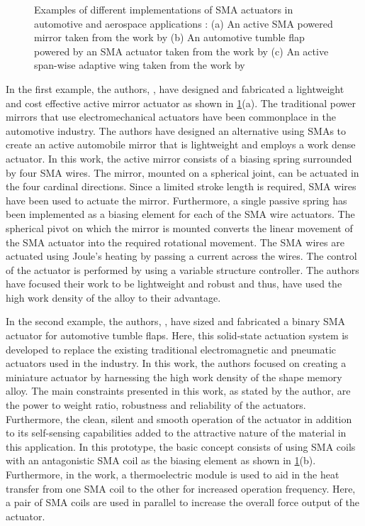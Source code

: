 \begin{figure}[hbt!]
    \centering
    
    \caption[Examples of different implementations of SMA actuators in automotive and aerospace applications]{Examples of different implementations of SMA actuators in automotive and aerospace applications : (a) An active SMA powered mirror taken from the work by \cite{williamsControlAutomotiveShape2010a} (b) An automotive tumble flap powered by an SMA actuator taken from the work by \cite{belliniMechatronicDesignShape2009} (c) An active span-wise adaptive wing taken from the work by \cite{belliniMechatronicDesignShape2009}}
    \label{fig:auto-examples}
\end{figure}

In the first example, the authors, \cite{williamsControlAutomotiveShape2010a}, have designed and fabricated a lightweight and cost effective active mirror actuator as shown in \cref{fig:auto-examples}(a). The traditional power mirrors that use electromechanical actuators have been commonplace in the automotive industry. The authors have designed an alternative using SMAs to create an active automobile mirror that is lightweight and employs a work dense actuator. In this work, the active mirror consists of a biasing spring surrounded by four SMA wires. The mirror, mounted on a spherical joint, can be actuated in the four cardinal directions. Since a limited stroke length is required, SMA wires have been used to actuate the mirror. Furthermore, a single passive spring has been implemented as a biasing element for each of the SMA wire actuators. The spherical pivot on which the mirror is mounted converts the linear movement of the SMA actuator into the required rotational movement. The SMA wires are actuated using Joule's heating by passing a current across the wires. The control of the actuator is performed by using a variable structure controller. The authors have focused their work to be lightweight and robust and thus, have used the high work density of the alloy to their advantage.

In the second example, the authors, \cite{belliniMechatronicDesignShape2009}, have sized and fabricated a binary SMA actuator for automotive tumble flaps. Here, this solid-state actuation system is developed to replace the existing traditional electromagnetic and pneumatic actuators used in the industry. In this work, the authors focused on creating a miniature actuator by harnessing the high work density of the shape memory alloy. The main constraints presented in this work, as stated by the author, are the power to weight ratio, robustness and reliability of the actuators. Furthermore, the clean, silent and smooth operation of the actuator in addition to its self-sensing capabilities added to the attractive nature of the material in this application. In this prototype, the basic concept consists of using SMA coils with an antagonistic SMA coil as the biasing element as shown in \cref{fig:auto-examples}(b). Furthermore, in the work, a thermoelectric module is used to aid in the heat transfer from one SMA coil to the other for increased operation frequency. Here, a pair of SMA coils are used in parallel to increase the overall force output of the actuator.


